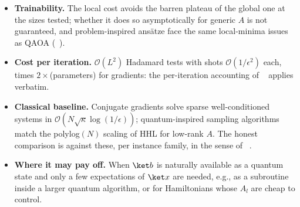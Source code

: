 \documentclass[handoutsbeamer.tex]{subfiles}
\begin{document}
\begin{frame}
\begin{itemize}\setlength\itemsep{0.3em}
    \item \textbf{Trainability.} The local cost avoids the barren plateau of the global one at the sizes tested; whether it does so asymptotically for generic $A$ is not guaranteed, and problem-inspired ansätze face the same local-minima issues as QAOA (\Chap~).
    \item \textbf{Cost per iteration.} $\mathcal O(L^2)$ Hadamard tests with shots $\mathcal O(1/\epsilon^2)$ each, times $2\times$(parameters) for gradients: the per-iteration accounting of \Chap~ applies verbatim.
    \item \textbf{Classical baseline.} Conjugate gradients solve sparse well-conditioned systems in $\mathcal O(N\sqrt\kappa\log(1/\epsilon))$; quantum-inspired sampling algorithms match the polylog$(N)$ scaling of HHL for low-rank $A$. The honest comparison is against these, per instance family, in the sense of \Chap~.
    \item \textbf{Where it may pay off.} When $\ket b$ is naturally available as a quantum state and only a few expectations of $\ket x$ are needed, e.g., as a subroutine inside a larger quantum algorithm, or for Hamiltonians whose $A_l$ are cheap to control.
\end{itemize}
\end{frame}

\begin{frame}[allowframebreaks]
\biblio
\end{frame}
\end{document}
